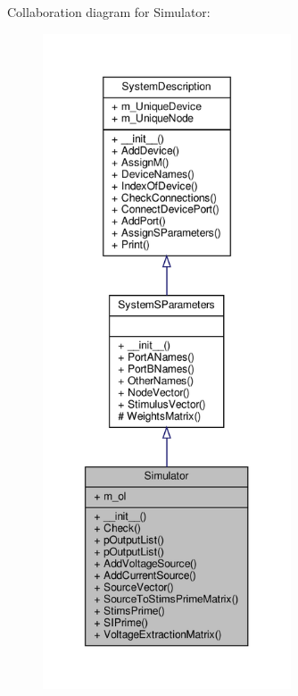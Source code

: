Collaboration diagram for Simulator\+:
\nopagebreak
\begin{figure}[H]
\begin{center}
\leavevmode
\includegraphics[height=550pt]{classSignalIntegrity_1_1SystemDescriptions_1_1Simulator_1_1Simulator__coll__graph}
\end{center}
\end{figure}
